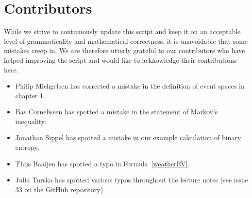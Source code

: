 \section*{Contributors}
While we strive to continuously update this script and keep it on an acceptable level of grammaticality and mathematical correctness, it is unavoidable that some
mistakes creep in. We are therefore utterly grateful to our contributors who have helped improving the script and would like to acknowledge their contributions here.
\begin{itemize}
\item Philip Michgelsen has corrected a mistake in the definition of event spaces in chapter 1.
\item Bas Cornelissen has spotted a mistake in the statement of Markov's inequality.
\item Jonathan Sippel has spotted a mistake in our example calculation
  of binary entropy.
\item Thijs Baaijen has spotted a typo in Formula~\eqref{weatherRV}.
\item Julia Turska has spotted various typos throughout the lecture notes (see issue 33 on the GitHub repository)
\end{itemize}